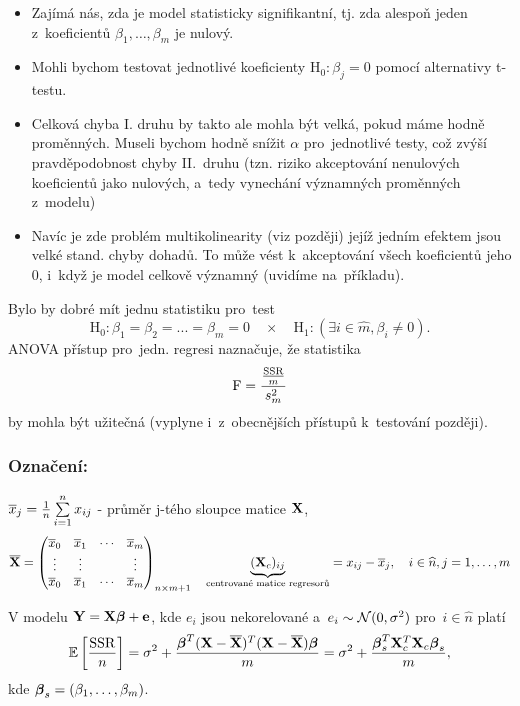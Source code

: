 \begin{itemize}
\item Zajímá nás, zda je model statisticky signifikantní, tj. zda alespoň jeden z~koeficientů $\beta_1,\dots, \beta_m$ je nulový.
\item Mohli bychom testovat jednotlivé koeficienty $\text{H}_0 : \beta_j = 0$ pomocí alternativy t-testu.
\item Celková chyba I. druhu by takto ale mohla být velká, pokud máme hodně proměnných. Museli bychom hodně snížit $\alpha$ pro~jednotlivé testy, což zvýší pravděpodobnost chyby II.~druhu (tzn. riziko akceptování nenulových koeficientů jako nulových, a~tedy vynechání významných proměnných z~modelu)
\item Navíc je zde problém multikolinearity (viz později) jejíž jedním efektem jsou velké stand. chyby dohadů. To může vést k~akceptování všech koeficientů jeho 0, i~když je model celkově významný (uvidíme na~příkladu).
\end{itemize}

Bylo by dobré mít jednu statistiku pro~test
 $$
\text{H}_0 : \beta_1 = \beta_2 = ... = \beta_m = 0 \quad \times \quad \text{H}_1 : (\exists i\in \widehat{m}, \beta_i \neq 0).
 $$
ANOVA přístup pro~jedn. regresi naznačuje, že statistika
 $$
\text{F} = \frac{\frac{\mathrm{SSR}}{m}}{s_m^2}
 $$
by mohla být užitečná (vyplyne i~z~obecnějších přístupů k~testování později).

\subsubsection*{Označení:}
 $\overline{x}_j = \frac{1}{n} \sum\limits_{i=1}^{n} x_{ij}$ - průměr j-tého sloupce matice $\mathbf{X}$,
 $$
	\overline{\mathbf{X}} = \begin{pmatrix}
	\overline{x}_0 & \overline{x}_1 & \cdots & \overline{x}_m \\
	\vdots & \vdots & & \vdots \\
	\overline{x}_0 & \overline{x}_1 & \cdots & \overline{x}_m
	\end{pmatrix}_{n \times m+1} \quad \underbrace{(\mathbf{X}_c)_{ij}}_{\text{centrované matice regresorů}} = x_{ij} - \overline{x}_j, \quad i\in\widehat{n}, j = 1,\dots, m
 $$

\begin{theorem}
	V modelu $\mathbf{Y} = \mathbf{X} \boldsymbol{\beta} + \mathbf{e}$, kde $e_i$ jsou nekorelované a~$e_i \sim \mathcal{N}(0,\sigma^2)$ pro~$i  \in\widehat{n} $ platí
	 $$
		\mathbb{E} \left[\frac{\mathrm{SSR}}{n} \right] = \sigma^2 + \frac{\boldsymbol{\beta}^T(\mathbf{X} - \overline{\mathbf{X}})^T(\mathbf{X} - \overline{\mathbf{X}}) \boldsymbol{\beta}}{m} = \sigma^2 + \frac{\boldsymbol{\beta}_s^T \mathbf{X}_c^T \mathbf{X}_c \boldsymbol{\beta}_s}{m},
	 $$
	kde $\boldsymbol{\beta}_s = (\beta_1,\dots, \beta_m)$.
\end{theorem}

